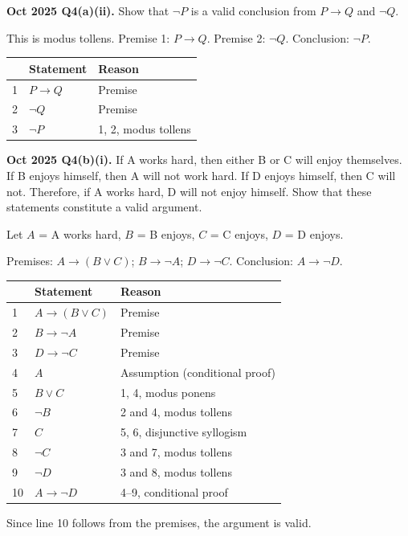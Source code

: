 \documentclass[11pt,a4paper]{article}
\begin{document}
\begin{pyqbox}
\textbf{Oct 2025 Q4(a)(ii).} Show that $\neg P$ is a valid conclusion from $P\to Q$ and $\neg Q$.
\end{pyqbox}

\begin{solbox}
This is modus tollens. Premise 1: $P\to Q$. Premise 2: $\neg Q$. Conclusion: $\neg P$.

\begin{center}\small
\begin{tabular}{lll}
\toprule & Statement & Reason\\\midrule
1 & $P\to Q$ & Premise\\
2 & $\neg Q$ & Premise\\
3 & $\neg P$ & 1, 2, modus tollens\\\bottomrule
\end{tabular}
\end{center}
\end{solbox}

\begin{pyqbox}
\textbf{Oct 2025 Q4(b)(i).} If A works hard, then either B or C will enjoy themselves. If B enjoys himself, then A will not work hard. If D enjoys himself, then C will not. Therefore, if A works hard, D will not enjoy himself. Show that these statements constitute a valid argument.
\end{pyqbox}

\begin{solbox}
Let $A$ = A works hard, $B$ = B enjoys, $C$ = C enjoys, $D$ = D enjoys.

Premises: $A\to(B\lor C)$; $B\to\neg A$; $D\to\neg C$.
Conclusion: $A\to\neg D$.

\begin{center}\small
\begin{tabular}{lll}
\toprule & Statement & Reason\\\midrule
1 & $A\to(B\lor C)$ & Premise\\
2 & $B\to\neg A$ & Premise\\
3 & $D\to\neg C$ & Premise\\
4 & $A$ & Assumption (conditional proof)\\
5 & $B\lor C$ & 1, 4, modus ponens\\
6 & $\neg B$ & 2 and 4, modus tollens\\
7 & $C$ & 5, 6, disjunctive syllogism\\
8 & $\neg C$ & 3 and 7, modus tollens\\
9 & $\neg D$ & 3 and 8, modus tollens\\
10 & $A\to\neg D$ & 4--9, conditional proof\\\bottomrule
\end{tabular}
\end{center}
Since line 10 follows from the premises, the argument is valid.
\end{solbox}
\end{document}
